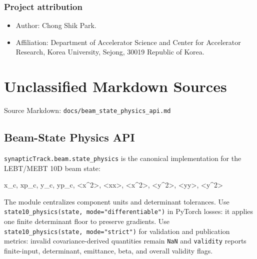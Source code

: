 \documentclass[
]{article}
\newenvironment{Shaded}{}{}
\newcommand{\NormalTok}[1]{#1}
\providecommand{\tightlist}{%
  \setlength{\itemsep}{0pt}\setlength{\parskip}{0pt}}
\begin{document}
\hypertarget{project-attribution}{%
\subsubsection{Project attribution}\label{project-attribution}}

\begin{itemize}
\tightlist
\item
  Author: Chong Shik Park.
\item
  Affiliation: Department of Accelerator Science and Center for
  Accelerator Research, Korea University, Sejong, 30019 Republic of
  Korea.
\end{itemize}

\hypertarget{unclassified-markdown-sources}{%
\section{Unclassified Markdown
Sources}\label{unclassified-markdown-sources}}

Source Markdown: \texttt{docs/beam\_state\_physics\_api.md}

\hypertarget{beam-state-physics-api}{%
\subsection{Beam-State Physics API}\label{beam-state-physics-api}}

\texttt{synapticTrack.beam.state\_physics} is the canonical
implementation for the LEBT/MEBT 10D beam state:

\begin{Shaded}
\begin{Highlighting}[]
\NormalTok{x\_c, xp\_c, y\_c, yp\_c, \textless{}x\^{}2\textgreater{}, \textless{}xx\textquotesingle{}\textgreater{}, \textless{}x\textquotesingle{}\^{}2\textgreater{}, \textless{}y\^{}2\textgreater{}, \textless{}yy\textquotesingle{}\textgreater{}, \textless{}y\textquotesingle{}\^{}2\textgreater{}}
\end{Highlighting}
\end{Shaded}

The module centralizes component units and determinant tolerances. Use
\texttt{state10\_physics(state,\ mode="differentiable")} in PyTorch
losses: it applies one finite determinant floor to preserve gradients.
Use \texttt{state10\_physics(state,\ mode="strict")} for validation and
publication metrics: invalid covariance-derived quantities remain
\texttt{NaN} and \texttt{validity} reports finite-input, determinant,
emittance, beta, and overall validity flags.
\end{document}
